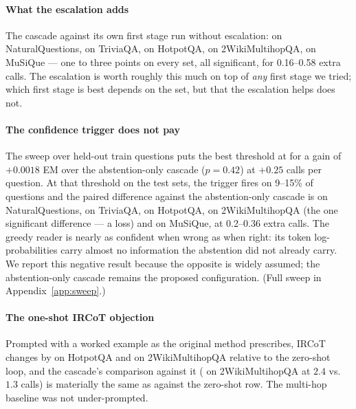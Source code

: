 \paragraph{What the escalation adds} The cascade against its own first
stage run without escalation: \FusedVsCascadeNQExactMatchDiff{} on
NaturalQuestions, \FusedVsCascadeTriviaQAExactMatchDiff{} on TriviaQA,
\FusedVsCascadeHotpotQAExactMatchDiff{} on HotpotQA,
\FusedVsCascadeTwoWikiExactMatchDiff{} on 2WikiMultihopQA,
\FusedVsCascadeMuSiQueExactMatchDiff{} on MuSiQue --- one to three points
on every set, all significant, for 0.16--0.58 extra calls. The escalation
is worth roughly this much on top of \emph{any} first stage we tried;
which first stage is best depends on the set, but that the escalation
helps does not.

\paragraph{The confidence trigger does not pay} The sweep over
\SweepQuestions{} held-out train questions puts the best threshold at
\SweepBestThreshold{} for a gain of $+0.0018$ EM over the abstention-only
cascade ($p=0.42$) at $+0.25$ calls per question. At that threshold on the
test sets, the trigger fires on 9--15\% of questions and the paired
difference against the abstention-only cascade is
\CascadeVsCascadeLogprobNQExactMatchDiff{} on NaturalQuestions,
\CascadeVsCascadeLogprobTriviaQAExactMatchDiff{} on TriviaQA,
\CascadeVsCascadeLogprobHotpotQAExactMatchDiff{} on HotpotQA,
\CascadeVsCascadeLogprobTwoWikiExactMatchDiff{} on 2WikiMultihopQA (the
one significant difference --- a loss) and
\CascadeVsCascadeLogprobMuSiQueExactMatchDiff{} on MuSiQue, at 0.2--0.36
extra calls. The greedy reader is nearly as confident when wrong as when
right: its token log-probabilities carry almost no information the
abstention did not already carry. We report this negative result because
the opposite is widely assumed; the abstention-only cascade remains the
proposed configuration. (Full sweep in Appendix~\ref{app:sweep}.)

\paragraph{The one-shot IRCoT objection} Prompted with a worked example
as the original method prescribes, IRCoT changes by
\IRCoTVsIRCoTOneShotHotpotQAExactMatchDiff{} on HotpotQA and
\IRCoTVsIRCoTOneShotTwoWikiExactMatchDiff{} on 2WikiMultihopQA relative
to the zero-shot loop, and the cascade's comparison against it
(\IRCoTOneShotVsCascadeTwoWikiExactMatchDiff{} on 2WikiMultihopQA at
$2.4$ vs.\ $1.3$ calls) is materially the same as against the zero-shot
row. The multi-hop baseline was not under-prompted.

